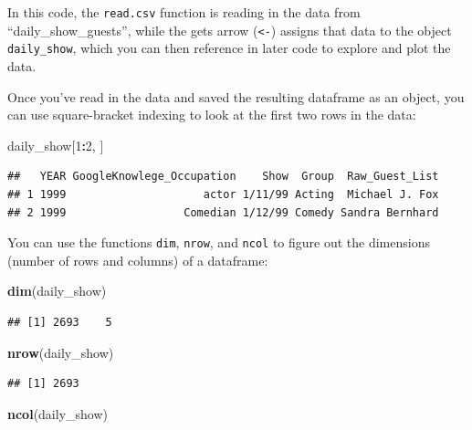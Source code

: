 \documentclass[]{book}
\makeatletter
\newenvironment{Shaded}{\begin{snugshade}}{\end{snugshade}}
\newcommand{\KeywordTok}[1]{\textcolor[rgb]{0.13,0.29,0.53}{\textbf{#1}}}
\newcommand{\DecValTok}[1]{\textcolor[rgb]{0.00,0.00,0.81}{#1}}
\newcommand{\OperatorTok}[1]{\textcolor[rgb]{0.81,0.36,0.00}{\textbf{#1}}}
\newcommand{\NormalTok}[1]{#1}
\newenvironment{kframe}{%
\medskip{}
\setlength{\fboxsep}{.8em}
 \def\at@end@of@kframe{}%
 \ifinner\ifhmode%
  \def\at@end@of@kframe{\end{minipage}}%
  \begin{minipage}{\columnwidth}%
 \fi\fi%
 \def\FrameCommand##1{\hskip\@totalleftmargin \hskip-\fboxsep
 \colorbox{shadecolor}{##1}\hskip-\fboxsep
     \hskip-\linewidth \hskip-\@totalleftmargin \hskip\columnwidth}%
 \MakeFramed {\advance\hsize-\width
   \@totalleftmargin\z@ \linewidth\hsize
   \@setminipage}}%
 {\par\unskip\endMakeFramed%
 \at@end@of@kframe}
\renewenvironment{Shaded}{\begin{kframe}}{\end{kframe}}
\theoremstyle{definition}
\theoremstyle{definition}
\theoremstyle{definition}
\theoremstyle{remark}
\makeatother
\begin{document}
In this code, the \texttt{read.csv} function is reading in the data from
``daily\_show\_guests'', while the gets arrow (\texttt{\textless{}-})
assigns that data to the object \texttt{daily\_show}, which you can then
reference in later code to explore and plot the data.

Once you've read in the data and saved the resulting dataframe as an
object, you can use square-bracket indexing to look at the first two
rows in the data:

\begin{Shaded}
\begin{Highlighting}[]
\NormalTok{daily_show[}\DecValTok{1}\OperatorTok{:}\DecValTok{2}\NormalTok{, ]}
\end{Highlighting}
\end{Shaded}

\begin{verbatim}
##   YEAR GoogleKnowlege_Occupation    Show  Group  Raw_Guest_List
## 1 1999                     actor 1/11/99 Acting  Michael J. Fox
## 2 1999                  Comedian 1/12/99 Comedy Sandra Bernhard
\end{verbatim}

You can use the functions \texttt{dim}, \texttt{nrow}, and \texttt{ncol}
to figure out the dimensions (number of rows and columns) of a
dataframe:

\begin{Shaded}
\begin{Highlighting}[]
\KeywordTok{dim}\NormalTok{(daily_show)}
\end{Highlighting}
\end{Shaded}

\begin{verbatim}
## [1] 2693    5
\end{verbatim}

\begin{Shaded}
\begin{Highlighting}[]
\KeywordTok{nrow}\NormalTok{(daily_show)}
\end{Highlighting}
\end{Shaded}

\begin{verbatim}
## [1] 2693
\end{verbatim}

\begin{Shaded}
\begin{Highlighting}[]
\KeywordTok{ncol}\NormalTok{(daily_show)}
\end{Highlighting}
\end{Shaded}
\end{document}
